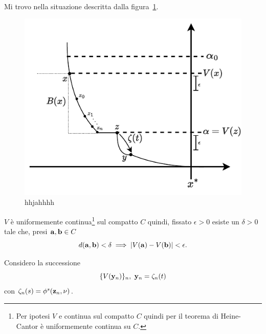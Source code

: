 \begin{steps}
\begin{align*}
    \end{align*}
    Mi trovo nella situazione descritta dalla figura~\ref{fig:ljapunov-dim-aff2}.
    \begin{figure}[H]
        \centering
        \includegraphics[clip,trim=2 2 2 2,width=.5\textwidth]{assets/ljapunov-dim-aff2}
        \caption[hhahh]{hhjahhhh}%
        \label{fig:ljapunov-dim-aff2}
    \end{figure}

    $V$ è uniformemente continua\footnote{Per ipotesi
        $V$ e continua sul compatto $C$ quindi per il teorema di Heine-Cantor è
        uniformemente continua su $C$.} sul compatto $C$ quindi, fissato $\epsilon >0$ esiste un $\delta > 0$
    tale che, presi $\mathbf{a}, \mathbf{b} \in C$
    \begin{equation}
        d(\mathbf{a}, \mathbf{b}) < \delta \implies |V(\mathbf{a}) - V(\mathbf{b})| < \epsilon.
        \label{eq:v-uniformemente-continua}
    \end{equation}

    Considero la successione
    \begin{equation*}
        \{V(\mathbf{y}_n)\}_n,\ \mathbf{y}_n = \zeta_n(t)
    \end{equation*}
    con $\zeta_n(s) = \phi^s(\mathbf{z}_n, \nu)$.


\end{steps}
